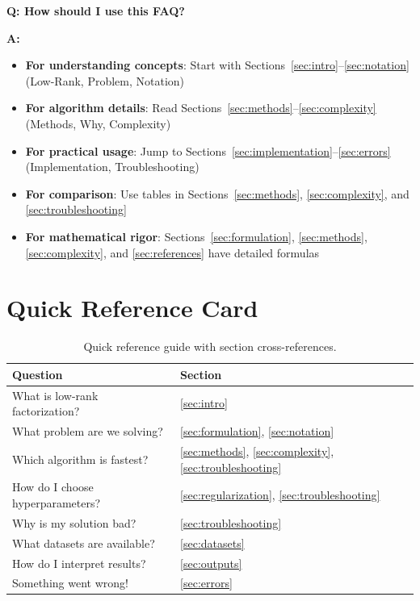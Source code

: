 \documentclass[11pt,oneside]{article}
\newcommand{\question}[1]{\textbf{Q: #1}}
\newcommand{\answer}{\textbf{A: }}
\begin{document}
\question{How should I use this FAQ?}

\answer

\begin{itemize}
    \item \textbf{For understanding concepts}: Start with Sections~\ref{sec:intro}--\ref{sec:notation} (Low-Rank, Problem, Notation)
    \item \textbf{For algorithm details}: Read Sections~\ref{sec:methods}--\ref{sec:complexity} (Methods, Why, Complexity)
    \item \textbf{For practical usage}: Jump to Sections~\ref{sec:implementation}--\ref{sec:errors} (Implementation, Troubleshooting)
    \item \textbf{For comparison}: Use tables in Sections~\ref{sec:methods}, \ref{sec:complexity}, and \ref{sec:troubleshooting}
    \item \textbf{For mathematical rigor}: Sections~\ref{sec:formulation}, \ref{sec:methods}, \ref{sec:complexity}, and \ref{sec:references} have detailed formulas
\end{itemize}

\section{Quick Reference Card}\label{sec:quick_ref}

\begin{table}[h]
\centering
\begin{tabular}{ll}
\toprule
\textbf{Question} & \textbf{Section} \\
\midrule
What is low-rank factorization? & \ref{sec:intro} \\
What problem are we solving? & \ref{sec:formulation}, \ref{sec:notation} \\
Which algorithm is fastest? & \ref{sec:methods}, \ref{sec:complexity}, \ref{sec:troubleshooting} \\
How do I choose hyperparameters? & \ref{sec:regularization}, \ref{sec:troubleshooting} \\
Why is my solution bad? & \ref{sec:troubleshooting} \\
What datasets are available? & \ref{sec:datasets} \\
How do I interpret results? & \ref{sec:outputs} \\
Something went wrong! & \ref{sec:errors} \\
\bottomrule
\end{tabular}
\caption{Quick reference guide with section cross-references.}
\end{table}
\end{document}
